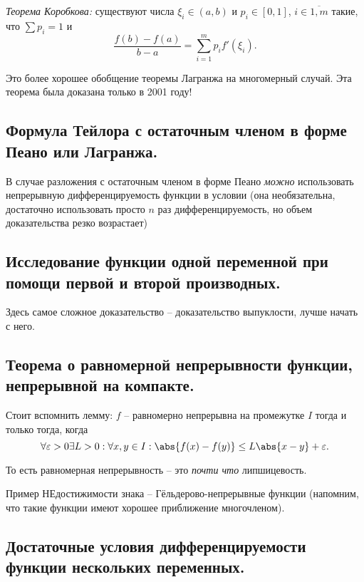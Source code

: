 \textit{Теорема Коробкова:} существуют числа $\xi_i \in (a, b)$ и $p_i \in [0, 1]$, $i \in \overline{1, m}$ такие, что $\sum p_i = 1$ и
\begin{equation*}
    \frac{f(b) - f(a)}{b - a} = \sum_{i = 1}^m p_if'(\xi_i).
\end{equation*}

Это более хорошее обобщение теоремы Лагранжа на многомерный случай. Эта теорема была доказана только в 2001 году!

\subsection{Формула Тейлора с остаточным членом в форме Пеано или Лагранжа.}

В случае разложения с остаточным членом в форме Пеано \textit{можно} использовать непрерывную дифференцируемость функции в условии (она необязательна, достаточно использовать просто $n$ раз дифференцируемость, но объем доказательства резко возрастает)

\subsection{Исследование функции одной переменной при помощи первой и второй производных.}

Здесь самое сложное доказательство -- доказательство выпуклости, лучше начать с него.

\subsection{Теорема о равномерной непрерывности функции, непрерывной на компакте.}

Стоит вспомнить лемму: $f$ -- равномерно непрерывна на промежутке $I$ тогда и только тогда, когда 
\begin{equation*}
    \forall \varepsilon > 0 \exists L > 0: \forall x, y \in I: \abs{f(x) - f(y)} \leq L\abs{x - y} + \varepsilon.
\end{equation*}

То есть равномерная непрерывность -- это \textit{почти что} липшицевость.

Пример НЕдостижимости знака -- Гёльдерово-непрерывные функции (напомним, что такие функции имеют хорошее приближение многочленом).

\subsection{Достаточные условия дифференцируемости функции нескольких переменных.}


